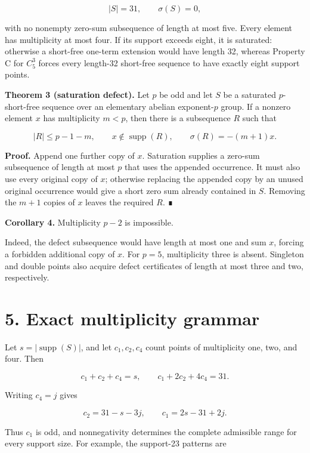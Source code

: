 \documentclass[
  11pt,
]{article}
\begin{document}
\[
|S|=31, \qquad \sigma(S)=0,
\]

with no nonempty zero-sum subsequence of length at most five. Every
element has multiplicity at most four. If its support exceeds eight, it
is saturated: otherwise a short-free one-term extension would have
length 32, whereas Property C for \(C_5^3\) forces every length-32
short-free sequence to have exactly eight support points.

\textbf{Theorem 3 (saturation defect).} Let \(p\) be odd and let \(S\)
be a saturated \(p\)-short-free sequence over an elementary abelian
exponent-\(p\) group. If a nonzero element \(x\) has multiplicity
\(m<p\), then there is a subsequence \(R\) such that

\[
|R|\le p-1-m,
\qquad x\notin\operatorname{supp}(R),
\qquad \sigma(R)=-(m+1)x.
\]

\textbf{Proof.} Append one further copy of \(x\). Saturation supplies a
zero-sum subsequence of length at most \(p\) that uses the appended
occurrence. It must also use every original copy of \(x\); otherwise
replacing the appended copy by an unused original occurrence would give
a short zero sum already contained in \(S\). Removing the \(m+1\) copies
of \(x\) leaves the required \(R\). ∎

\textbf{Corollary 4.} Multiplicity \(p-2\) is impossible.

Indeed, the defect subsequence would have length at most one and sum
\(x\), forcing a forbidden additional copy of \(x\). For \(p=5\),
multiplicity three is absent. Singleton and double points also acquire
defect certificates of length at most three and two, respectively.

\hypertarget{exact-multiplicity-grammar}{%
\section{5. Exact multiplicity
grammar}\label{exact-multiplicity-grammar}}

Let \(s=|\operatorname{supp}(S)|\), and let \(c_1, c_2, c_4\) count
points of multiplicity one, two, and four. Then

\[
c_1+c_2+c_4=s,
\qquad
c_1+2c_2+4c_4=31.
\]

Writing \(c_4=j\) gives

\[
c_2=31-s-3j,
\qquad
c_1=2s-31+2j.
\]

Thus \(c_1\) is odd, and nonnegativity determines the complete
admissible range for every support size. For example, the support-23
patterns are
\end{document}
